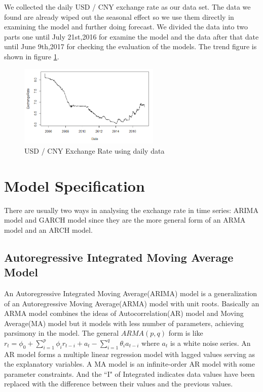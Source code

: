 \documentclass[12pt, a4paper, titlepage]{article}
\begin{document}
We collected the daily USD / CNY exchange rate as our data set. The data we found are already wiped out the seasonal effect so we use them directly in examining the model and further doing forecast. We divided the data into two parts one until July 21st,2016 for examine the model and the data after that date until June 9th,2017 for checking the evaluation of the models. The trend figure is shown in figure \ref{daily}.\\
\begin{figure}[h!]
\begin{center}
\caption{USD / CNY Exchange Rate using daily data}\label{daily}
\includegraphics[width=0.6\textwidth]{daily.png} 
\end{center}
\end{figure}

\section{Model Specification}
There are usually two ways in analysing the exchange rate in time series: ARIMA model and GARCH model since they are the more general form of an ARMA model and an ARCH model. 

\subsection{Autoregressive Integrated Moving Average Model}
An Autoregressive Integrated Moving Average(ARIMA) model is a generalization of an Autoregressive Moving Average(ARMA) model with unit roots. Basically an ARMA model combines the ideas of Autocorrelation(AR) model and Moving Average(MA) model but it models with less number of parameters, achieving parsimony in the model. The general $ARMA(p,q)$ form is like $r_t = \phi_0 + \sum_{i=1}^p \phi_i r_{t-i} + a_t - \sum_{i=1}^q \theta_i a_{t-i}$ where ${a_t}$ is a white noise series. An AR model forms a multiple linear regression model with lagged values serving as the explanatory variables. A MA model is an infinite-order AR model with some parameter constraints. And the ``I" of Integrated indicates data values have been replaced with the difference between their values and the previous values.\\
\end{document}
